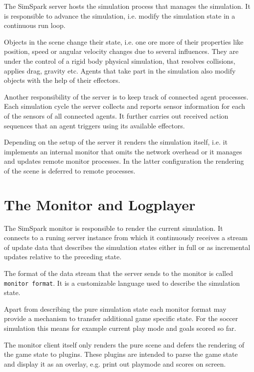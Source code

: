 The SimSpark server hosts the simulation process that manages the
simulation. It is responsible to advance the simulation, i.e. modify
the simulation state in a continuous run loop.

Objects in the scene change their state, i.e. one ore more of their
properties like position, speed or angular velocity changes due to
several influences. They are under the control of a rigid body
physical simulation, that resolves collisions, applies drag, gravity
etc. Agents that take part in the simulation also modify objects with
the help of their effectors.

Another responsibility of the server is to keep track of connected
agent processes. Each simulation cycle the server collects and reports
sensor information for each of the sensors of all connected agents. It
further carries out received action sequences that an agent triggers
using its available effectors.

Depending on the setup of the server it renders the simulation itself,
i.e. it implements an internal monitor that omits the network overhead
or it manages and updates remote monitor processes. In the latter
configuration the rendering of the scene is deferred to remote
processes.

\section{The Monitor and Logplayer}

The SimSpark monitor is responsible to render the current
simulation. It connects to a runing server instance from which it
continuously receives a stream of update data that describes the
simulation states either in full or as incremental updates relative to
the preceding state.

The format of the data stream that the server sends to the monitor is
called \texttt{monitor format}. It is a customizable language used to
describe the simulation state. 

Apart from describing the pure simulation state each monitor format
may provide a mechanism to transfer additional game specific
state. For the soccer simulation this means for example current play
mode and goals scored so far.

The monitor client itself only renders the pure scene and defers the
rendering of the game state to plugins. These plugins are intended to
parse the game state and display it as an overlay, e.g. print out
playmode and scores on screen.


